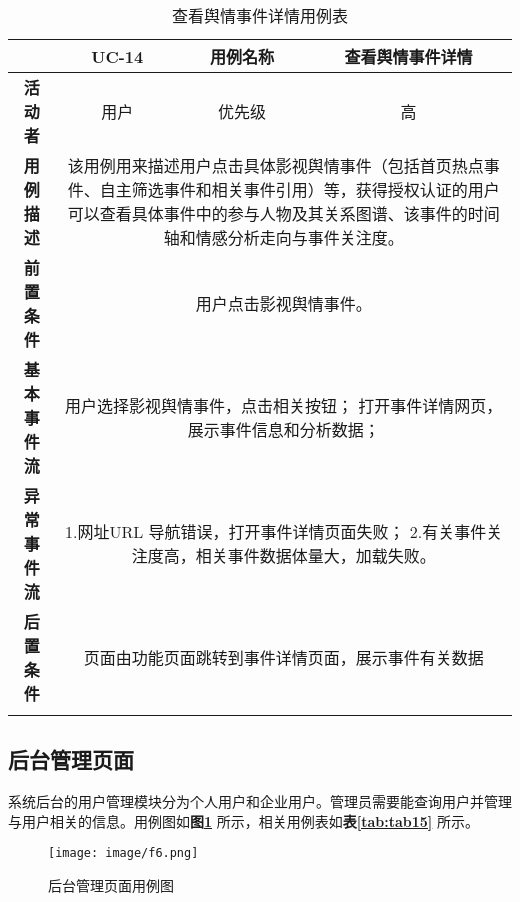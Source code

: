 \begin{longtable}[c]{c|ccc}
	\caption{查看舆情事件详情用例表}
	\label{tab:tab14}\\
	\shline
	\multicolumn{1}{c|}{\textbf{用例编号}} & \multicolumn{1}{c|}{UC-14} & \multicolumn{1}{c|}{用例名称} &  查看舆情事件详情\\ \hline
	\endhead
	\multicolumn{1}{c|}{\textbf{活动者}} & \multicolumn{1}{c|}{用户} & \multicolumn{1}{c|}{优先级} &高  \\ \hline
	\textbf{用例描述} & \multicolumn{3}{p{12cm}}{该用例用来描述用户点击具体影视舆情事件（包括首页热点事件、自主筛选事件和相关事件引用）等，获得授权认证的用户可以查看具体事件中的参与人物及其关系图谱、该事件的时间轴和情感分析走向与事件关注度。} \\ \hline
	\textbf{前置条件}& \multicolumn{3}{p{12cm}}{用户点击影视舆情事件。} \\ \hline
	\textbf{基本事件流}& \multicolumn{3}{p{12cm}}{用户选择影视舆情事件，点击相关按钮；\newline
		打开事件详情网页，展示事件信息和分析数据；
		} \\ \hline
	\textbf{异常事件流}& \multicolumn{3}{p{12cm}}{1.网址URL 导航错误，打开事件详情页面失败；\newline
		2.有关事件关注度高，相关事件数据体量大，加载失败。
	} \\ \hline
	\textbf{后置条件}& \multicolumn{3}{p{12cm}}{页面由功能页面跳转到事件详情页面，展示事件有关数据} \\ \shline
\end{longtable}

\subsection{后台管理页面}
系统后台的用户管理模块分为个人用户和企业用户。管理员需要能查询用户并管理与用户相关的信息。用例图如\textbf{图\ref{fig:fig6}} 所示，相关用例表如\textbf{表\ref{tab:tab15}} 所示。
\newpage
\begin{figure}[!htb]
	\centering\label{fig:fig6}
	\texttt{[image: image/f6.png]}
	\caption{后台管理页面用例图}
\end{figure}


